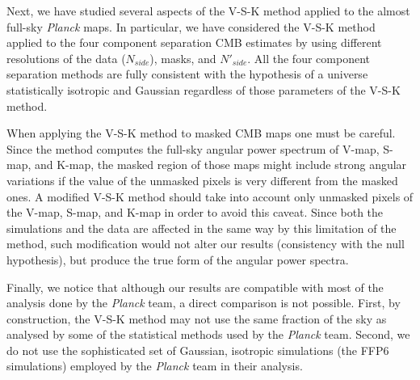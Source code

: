 Next, we have studied several aspects of the V-S-K method applied to the almost full-sky \textit{Planck} maps. In particular, we have considered the V-S-K method applied to the four component separation CMB estimates by using different resolutions of the data ($ N_{side} $), masks, and $ N'_{side} $. All the four component separation methods are fully consistent with the hypothesis of a universe statistically isotropic and Gaussian regardless of those parameters of the V-S-K method. 

When applying the V-S-K method to masked CMB maps one must be careful. Since the method computes the full-sky angular power spectrum of V-map, S-map, and K-map, the masked region of those maps might include strong angular variations if the value of the unmasked pixels is very different from the masked ones.  A modified V-S-K method should take into account only unmasked pixels of the V-map, S-map, and K-map in order to avoid this caveat. Since both the simulations and the data are affected in the same way by this limitation of the method, such modification would not alter our results (consistency with the null hypothesis), but produce the true form of the angular power spectra. 

Finally, we notice that although our results are compatible with most of the analysis done by the \textit{Planck} team, a direct comparison is not possible. First, by construction, the V-S-K method may not use the same fraction of the sky as analysed by some of the statistical methods used by the \textit{Planck} team. Second, we do not use the sophisticated set  of Gaussian, isotropic simulations  (the FFP6 simulations) employed by the \textit{Planck} team in their analysis. 